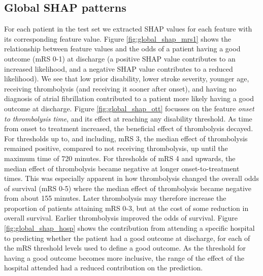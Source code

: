 \subsection{Global SHAP patterns}

For each patient in the test set we extracted SHAP values for each feature with its corresponding feature value. Figure \ref{fig:global_shap_mrs1} shows the relationship between feature values and the odds of a patient having a good outcome (mRS 0-1) at discharge (a positive SHAP value contributes to an increased likelihood, and a negative SHAP value contributes to a reduced likelihood). We see that low prior disability, lower stroke severity, younger age, receiving thrombolysis (and receiving it sooner after onset), and having no diagnosis of atrial fibrillation contributed to a patient more likely having a good outcome at discharge. Figure \ref{fig:global_shap_ott} focusses on the feature \textit{onset to thrombolysis time}, and its effect at reaching any disability threshold. As time from onset to treatment increased, the beneficial effect of thrombolysis decayed. For thresholds up to, and including, mRS 3, the median effect of thrombolysis remained positive, compared to not receiving thrombolysis, up until the maximum time of 720 minutes. For thresholds of mRS 4 and upwards, the median effect of thrombolysis became negative at longer onset-to-treatment times. This was especially apparent in how thrombolysis changed the overall odds of survival (mRS 0-5) where the median effect of thrombolysis became negative from about 155 minutes. Later thrombolysis may therefore increase the proportion of patients attaining mRS 0-3, but at the cost of some reduction in overall survival. Earlier thrombolysis improved the odds of survival. Figure \ref{fig:global_shap_hosp} shows the contribution from attending a specific hospital to predicting whether the patient had a good outcome at discharge, for each of the mRS threshold levels used to define a good outcome. As the threshold for having a good outcome becomes more inclusive, the range of the effect of the hospital attended had a reduced contribution on the prediction.



